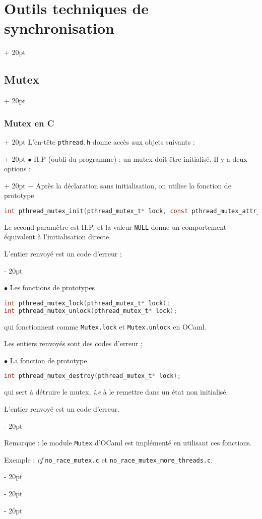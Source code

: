 \documentclass[a4paper, 12pt, twoside]{article}
\newcommand{\ind}[1][20pt]{\advance\leftskip + #1}
\newcommand{\deind}[1][20pt]{\advance\leftskip - #1}
\newenvironment{indt}[2][20pt]{#2 \par \ind[#1]}{\par \deind} %
\begin{document}
\begin{indt}{\section{Outils techniques de synchronisation}}
\begin{indt}{\subsection{Mutex}}
\begin{indt}{\subsubsection{Mutex en C}}
\begin{indt}{L'en-tête \texttt{pthread.h} donne accès aux objets suivants :}
\begin{indt}{$\bullet$ H.P (oubli du programme) : un mutex doit être initialisé. Il y a deux options :}
                        $-$ Après la déclaration sans initialisation, on utilise la fonction de prototype
                        \begin{lstlisting}[language=C, xleftmargin=120pt]
int pthread_mutex_init(pthread_mutex_t* lock, const pthread_mutex_attr_t* attr);\end{lstlisting}

                        Le second paramètre est H.P, et la valeur \texttt{NULL} donne un comportement équivalent à l'initialisation directe.

                        L'entier renvoyé est un code d'erreur ;
                    \end{indt}

                    \vspace{6pt}
                    
                    $\bullet$ Les fonctions de prototypes
                    \begin{lstlisting}[language=C, xleftmargin=100pt]
int pthread_mutex_lock(pthread_mutex_t* lock);
int pthread_mutex_unlock(pthread_mutex_t* lock);\end{lstlisting}

                    qui fonctionnent comme \texttt{Mutex.lock} et \texttt{Mutex.unlock} en OCaml.

                    Les entiers renvoyés sont des codes d'erreur ;

                    \vspace{6pt}
                    
                    $\bullet$ La fonction de prototype
                    \begin{lstlisting}[language=C, xleftmargin=100pt]
int pthread_mutex_destroy(pthread_mutex_t* lock);\end{lstlisting}

                    qui sert à détruire le mutex, \textit{i.e} à le remettre dans un état non initialisé.

                    L'entier renvoyé est un code d'erreur.
                \end{indt}

                \vspace{12pt}
                
                Remarque : le module \texttt{Mutex} d'OCaml est implémenté en utilisant ces fonctions.

                Exemple : \textit{cf} \texttt{no\_race\_mutex.c} et \texttt{no\_race\_mutex\_more\_threads.c}.
            \end{indt}


\end{indt}
\end{indt}
\end{document}
